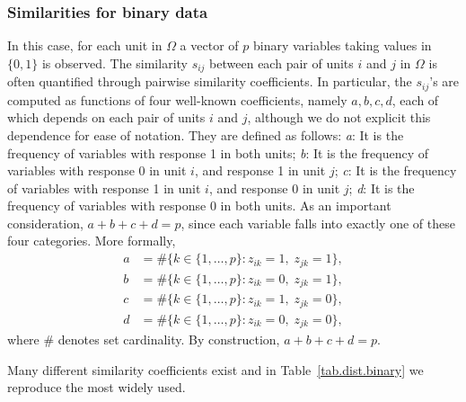 \subsubsection{Similarities for binary data}

In this case, for each unit in $\Omega$ a vector of $p$ binary variables taking values in $\{0,1\}$ is observed. The similarity $s_{ij}$ between each pair of units $i$ and $j$ in $\Omega$ is often quantified through pairwise similarity coefficients. In particular, the $s_{ij}$'s are computed as functions of four well-known coefficients, namely $a,b,c,d$, each of which depends on each pair of units $i$ and $j$, although we do not explicit this dependence for ease of notation. They are defined as follows: \emph{a}: It is the frequency of variables with response 1 in both units; \emph{b}: It is the frequency of variables with response 0 in unit $i$, and response 1 in unit $j$; \emph{c}: It is the frequency of variables with response 1 in unit $i$, and response 0 in unit $j$; \emph{d}: It is the frequency of variables with response 0 in both units. As an important consideration, $a+b+c+d = p$, since each variable falls into exactly one of these four categories. 
More formally,
\[ \begin{aligned} a &= \#\{k \in \{1,\ldots,p\}: z_{ik}=1,\; z_{jk}=1\},\\ b &= \#\{k \in \{1,\ldots,p\}: z_{ik}=0,\; z_{jk}=1\},\\ c &= \#\{k \in \{1,\ldots,p\}: z_{ik}=1,\; z_{jk}=0\},\\ d &= \#\{k \in \{1,\ldots,p\}: z_{ik}=0,\; z_{jk}=0\}, \end{aligned} \] 
where $\#$ denotes set cardinality. By construction, $a+b+c+d=p$.

Many different similarity coefficients exist and in Table~\ref{tab.dist.binary} we reproduce the most widely used.

